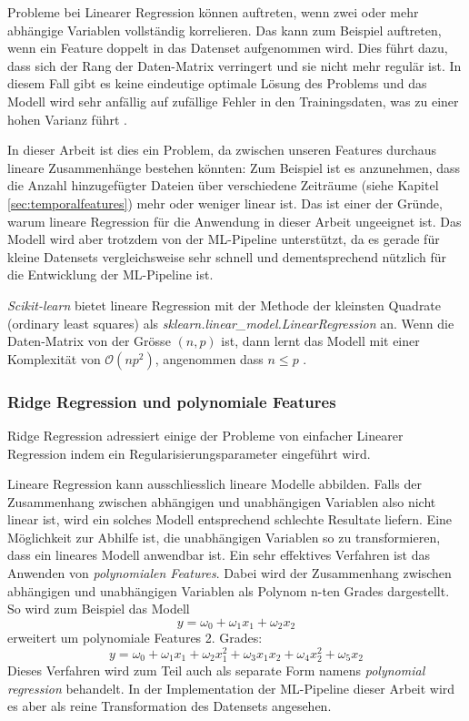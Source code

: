 \documentclass[10pt, a4paper]{article}
\begin{document}
Probleme bei Linearer Regression können auftreten, wenn zwei oder mehr abhängige Variablen vollständig korrelieren. Das kann zum Beispiel auftreten, wenn ein Feature doppelt in das Datenset aufgenommen wird. Dies führt dazu, dass sich der Rang der Daten-Matrix verringert und sie nicht mehr regulär ist. In diesem Fall gibt es keine eindeutige optimale Lösung des Problems und das Modell wird sehr anfällig auf zufällige Fehler in den Trainingsdaten, was zu einer hohen Varianz führt \cite{linregmulticollinearity}.

In dieser Arbeit ist dies ein Problem, da zwischen unseren Features durchaus lineare Zusammenhänge bestehen könnten: Zum Beispiel ist es anzunehmen, dass die Anzahl hinzugefügter Dateien über verschiedene Zeiträume (siehe Kapitel \ref{sec:temporalfeatures}) mehr oder weniger linear ist. Das ist einer der Gründe, warum lineare Regression für die Anwendung in dieser Arbeit ungeeignet ist. Das Modell wird aber trotzdem von der ML-Pipeline unterstützt, da es gerade für kleine Datensets vergleichsweise sehr schnell und dementsprechend nützlich für die Entwicklung der ML-Pipeline ist.

\emph{Scikit-learn} bietet lineare Regression mit der Methode der kleinsten Quadrate (ordinary least squares) als \textit{sklearn.linear\_model.LinearRegression} an. Wenn die Daten-Matrix von der Grösse \((n, p)\) ist, dann lernt das Modell mit einer Komplexität von \(
\mathcal{O}(np^2)
\), angenommen dass \(n \leq p\) \cite{sklearnlinearmodel}.

\subsubsection{Ridge Regression und polynomiale Features} \label{sec:ridgereg}
Ridge Regression adressiert einige der Probleme von einfacher Linearer Regression indem ein Regularisierungsparameter eingeführt wird.

Lineare Regression kann ausschliesslich lineare Modelle abbilden. Falls der Zusammenhang zwischen abhängigen und unabhängigen Variablen also nicht linear ist, wird ein solches Modell entsprechend schlechte Resultate liefern. Eine Möglichkeit zur Abhilfe ist, die unabhängigen Variablen so zu transformieren, dass ein lineares Modell anwendbar ist. Ein sehr effektives Verfahren ist das Anwenden von \emph{polynomialen Features}. Dabei wird der Zusammenhang zwischen abhängigen und unabhängigen Variablen als Polynom n-ten Grades dargestellt. 
So wird zum Beispiel das Modell
\[
y = \omega_0 + \omega_1 x_1 + \omega_2 x_2
\]
erweitert um polynomiale Features 2. Grades:
\[
y = \omega_0 + \omega_1 x_1 + \omega_2 x_1^2 + \omega_3 x_1 x_2 + \omega_4 x_2^2 + \omega_5 x_2
\]
Dieses Verfahren wird zum Teil auch als separate Form namens \textit{polynomial regression} behandelt. In der Implementation der ML-Pipeline dieser Arbeit wird es aber als reine Transformation des Datensets angesehen.
\end{document}
